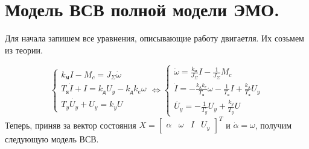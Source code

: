 \documentclass[a4paper, 11pt]{article}
\begin{document}
\section*{Модель ВСВ полной модели ЭМО.}
Для начала запишем все уравнения, описывающие работу двигаетля. Их созьмем из теории.

\begin{equation}
    \begin{cases}
        k_\text{м}I - M_c = J_\Sigma \dot{\omega} \\
        T_\text{я}\dot{I} + I = k_\text{д}U_y - k_\text{д}k_e\omega \\
        T_y\dot{U_y} + U_y = k_yU
    \end{cases} \Leftrightarrow
    \begin{cases}
        \dot{\omega} = \frac{k_\text{м}}{J_\Sigma}I - \frac{1}{J_\Sigma}M_c \\
        \dot{I} = - \frac{k_\text{д}k_e}{T_\text{я}}\omega - \frac{1}{T_\text{я}}I + \frac{k_\text{д}}{T_\text{я}}U_y \\
        \dot{U_y} = -\frac{1}{T_y}U_y + \frac{k_y}{T_y}U
    \end{cases}
\end{equation}
Теперь, приняв за вектор состояния $X = \begin{bmatrix} \alpha & \omega & I & U_y \end{bmatrix}^T$ и $\dot{\alpha} = \omega$, получим следующую модель ВСВ.
\end{document}
